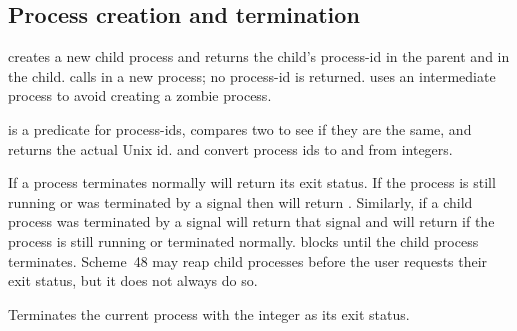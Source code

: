 \subsection{Process creation and termination}
\label{processes}

\begin{protos}
\end{protos}
\noindent
{} creates a new child process and returns the child's process-id in
 the parent and  in the child.
 calls  in a new process; no process-id
 is returned.
 uses an intermediate process to avoid creating
 a zombie process.

\begin{protos}
\end{protos}
\noindent
 is a predicate for process-ids,
 compares two to see if they are the same,
 and  returns the actual Unix id.
 and 
 convert process ids to and from integers.

\begin{protos}
\end{protos}
\noindent
If a process terminates normally
  will return its exit status.
If the process is still running or was terminated by a signal then
  will return .
Similarly, if a child process was terminated by a signal
  will return that signal and
 will return  if the process is still running or terminated
 normally.
 blocks until the child process terminates.
Scheme~48 may reap child processes before the user requests their
 exit status, but it does not always do so.

\begin{protos}
\end{protos}
\noindent
Terminates the current process with the integer 
 as its exit status.

